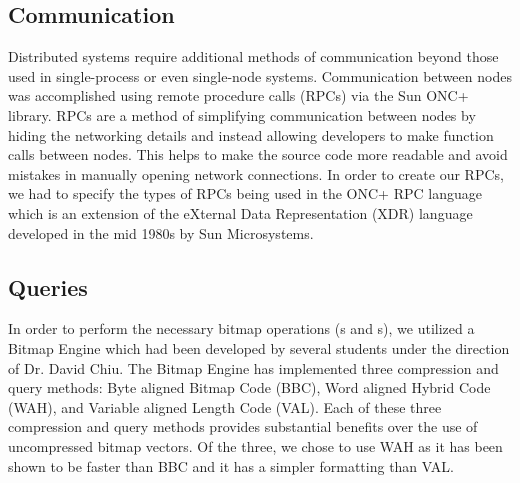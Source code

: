 \subsection{Communication}
Distributed systems require additional methods of communication beyond those used in single-process or even single-node systems.
Communication between nodes was accomplished using remote procedure calls (RPCs) via the Sun ONC+ library.
RPCs are a method of simplifying communication between nodes by hiding the networking details and instead allowing developers to make function calls between nodes.
This helps to make the source code more readable and avoid mistakes in manually opening network connections.
In order to create our RPCs, we had to specify the types of RPCs being used in the ONC+ RPC language which is an extension of the eXternal Data Representation (XDR) language developed in the mid 1980s by Sun Microsystems.
%
\subsection{Queries}
In order to perform the necessary bitmap operations (s and s), we utilized a Bitmap Engine which had been developed by several students under the direction of Dr. David Chiu.
The Bitmap Engine has implemented three compression and query methods: Byte aligned Bitmap Code (BBC), Word aligned Hybrid Code (WAH), and Variable aligned Length Code (VAL).
Each of these three compression and query methods provides substantial benefits over the use of uncompressed bitmap vectors.
Of the three, we chose to use WAH as it has been shown to be faster than BBC and it has a simpler formatting than VAL.
%
